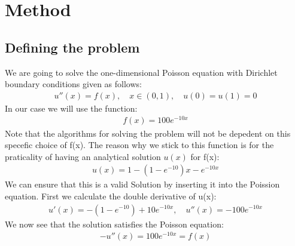 \documentclass[american,a4paper,12pt]{article}
\begin{document}
\section{Method}
  \subsection{Defining the problem}
    We are going to solve the one-dimensional Poisson equation with Dirichlet boundary conditions given as follows:
    \begin{align*}
      u''(x) = f(x), \quad x \in (0,1), \quad u(0) = u(1) = 0
    \end{align*}
    In our case we will use the function:
    \begin{align*}
      f(x) = 100e^{-10x}
    \end{align*}
    Note that the algorithms for solving the problem will not be depedent on this specefic choice of f(x). The reason why we stick to this function is for the praticality of having an analytical solution $u(x)$ for f(x):
    \begin{align*}
      u(x) = 1 - (1 - e^{-10})x - e^{-10x}
    \end{align*}
    We can ensure that this is a valid Solution by inserting it into the Poission equation. First we calculate the double derivative of u(x):
    \begin{align*}
      u'(x) = -(1 - e^{-10}) + 10e^{-10x}, \quad u''(x) = -100e^{-10x}
    \end{align*}
    We now see that the solution satisfies the Poisson equation:
    \begin{align*}
      -u''(x) = 100e^{-10x} = f(x)
    \end{align*}
\end{document}
